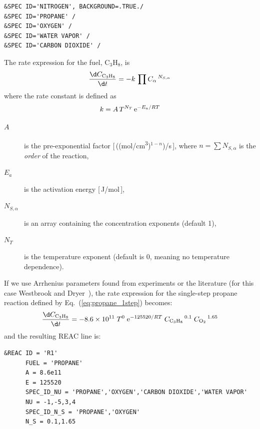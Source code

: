 \documentclass[11pt]{book}
\begin{document}
\begin{lstlisting}
&SPEC ID='NITROGEN', BACKGROUND=.TRUE./
&SPEC ID='PROPANE' /
&SPEC ID='OXYGEN' /
&SPEC ID='WATER VAPOR' /
&SPEC ID='CARBON DIOXIDE' /
\end{lstlisting}
The rate expression for the fuel, $\mathrm{C_3H_8}$, is
\begin{equation}\label{eq:finite_rate}
\frac{\d C_{\mathrm{C_3H_8}}}{\d t}= -k \, \prod C_{\alpha}\,^{N_{S,\alpha}}
\end{equation}
where the rate constant is defined as
\begin{equation}\label{eq:reac_rate}
k = A \, T^{N_{T}} \, {\rm e}^{-E_a/RT}
\end{equation}
\begin{description}
\item[$A$] is the pre-exponential factor [\,((\si{mol/cm^3})$^{1-n}$)/s\,], where $n=\sum N_{S,\alpha}$ is the \emph{order} of the reaction,
\item[$E_a$] is the activation energy [\,\si{J/mol}\,],
\item[$N_{S,\alpha}$] is an array containing the concentration exponents (default 1),
\item[$N_T$] is the temperature exponent (default is 0, meaning no temperature dependence).
\end{description}

If we use Arrhenius parameters found from experiments or the literature (for this case Westbrook and Dryer~\cite{Westbrook:1}), the rate expression for the single-step propane reaction defined by Eq.~(\ref{eq:propane_1step}) becomes:
\begin{equation}\label{eq:reac_rate2}
\frac{\d C_{\mathrm{C_3H_8}}}{\d t} = -8.6 \times 10^{11} \; T^{0} \; {\rm e}^{-125520/RT} \; C_{\mathrm{C_3H_8}}\,^{0.1} \; C_{\mathrm{O_2}}\,^{1.65}
\end{equation}
and the resulting {\ct REAC} line is:

\begin{lstlisting}
&REAC ID = 'R1'
      FUEL = 'PROPANE'
      A = 8.6e11
      E = 125520
      SPEC_ID_NU = 'PROPANE','OXYGEN','CARBON DIOXIDE','WATER VAPOR'
      NU = -1,-5,3,4
      SPEC_ID_N_S = 'PROPANE','OXYGEN'
      N_S = 0.1,1.65
\end{lstlisting}
\end{document}
